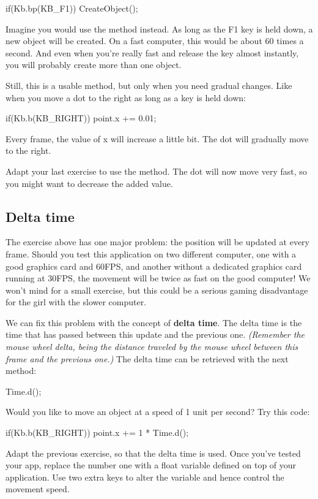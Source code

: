 \begin{code}
if(Kb.bp(KB_F1)) CreateObject();
\end{code}

Imagine you would use the method  instead. As long as the F1 key is held down, a new object will be created. On a fast computer, this would be about 60 times a second. And even when you're really fast and release the key almost instantly, you will probably create more than one object.

Still, this is a usable method, but only when you need gradual changes. Like when you move a dot to the right as long as a key is held down:

\begin{code}
if(Kb.b(KB_RIGHT)) point.x += 0.01;
\end{code}

Every frame, the value of x will increase a little bit. The dot will gradually move to the right.

\begin{exercise}
Adapt your last exercise to use the  method. The dot will now move very fast, so you might want to decrease the added value.
\end{exercise}

\subsection{Delta time}
The exercise above has one major problem: the position will be updated at every frame. Should you test this application on two different computer, one with a good graphics card and 60FPS, and another without a dedicated graphics card running at 30FPS, the movement will be twice as fast on the good computer! We won't mind for a small exercise, but this could be a serious gaming disadvantage for the girl with the slower computer.

We can fix this problem with the concept of \textbf{delta time}. The delta time is the time that has passed between this update and the previous one. \textsl{(Remember the mouse wheel delta, being the distance traveled by the mouse wheel between this frame and the previous one.)} The delta time can be retrieved with the next method:

\begin{code}
Time.d();
\end{code}
Would you like to move an object at a speed of 1 unit per second? Try this code:

\begin{code}
if(Kb.b(KB_RIGHT)) point.x += 1 * Time.d();
\end{code}

\begin{exercise}
Adapt the previous exercise, so that the delta time is used. Once you've tested your app, replace the number one with a float variable defined on top of your application. Use two extra keys to alter the variable and hence control the movement speed.
\end{exercise}



